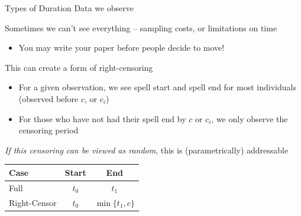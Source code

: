 \documentclass[notes,11pt, aspectratio=169]{beamer}
\newenvironment{wideitemize}{\itemize\addtolength{\itemsep}{10pt}}{\enditemize}
\begin{document}
\begin{frame}{Types of Duration Data we observe}
  \begin{wideitemize}
  \item Sometimes we can't see everything -- sampling costs, or
    limitations on time
    \begin{itemize}
    \item You may write your paper before people decide to move!
    \end{itemize}
  \item This can create a form of right-censoring
    \begin{itemize}
    \item For a given observation, we see spell start and spell end
      for most individuals (observed before $c$, or $c_{i}$)
    \item For those who have not had their spell end by $c$ or
      $c_{i}$, we only observe the censoring period
    \end{itemize}
  \item \emph{If this censoring can be viewed as random}, this is
    (parametrically) addressable
  \end{wideitemize}
  \begin{center}
    \begin{tabular}{lcc}
      Case & Start & End\\
      \midrule
      Full & $t_{0}$ & $t_{1}$\\
      Right-Censor & $t_{0}$ & $\min\{{t_{1}, c}\}$\\      
    \end{tabular}
\end{center}
\end{frame}
\end{document}
